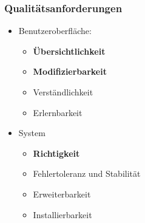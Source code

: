 \documentclass{beamer}
\begin{document}
\begin{frame}
\frametitle{Qualitätsanforderungen}
\begin{itemize}
\item Benutzeroberfläche:
\begin{itemize}
\item \textbf{Übersichtlichkeit}
\item \textbf{Modifizierbarkeit}
\item Verständlichkeit
\item Erlernbarkeit

\end{itemize}
\item System
\begin{itemize}
\item \textbf{Richtigkeit}
\item Fehlertoleranz und Stabilität
\item Erweiterbarkeit
\item Installierbarkeit
\end{itemize}
\end{itemize}
\end{frame}










\end{document}
